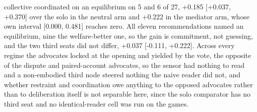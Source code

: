 collective coordinated on an equilibrium on 5 and 6 of 27, +0.185
[+0.037, +0.370] over the solo in the neutral arm and +0.222 in the
mediator arm, whose own interval [0.000, 0.481] reaches zero. All eleven
recommendations named an equilibrium, nine the welfare-better one, so
the gain is commitment, not guessing, and the two third seats did not
differ, +0.037 [-0.111, +0.222]. Across every regime the advocates locked
at the opening and yielded by the vote, the opposite of the dispute and
paired-account advocates, so the sensor had nothing to read and a
non-embodied third node steered nothing the naive reader did not, and
whether restraint and coordination owe anything to the opposed advocates
rather than to deliberation itself is not separable here, since the solo
comparator has no third seat and no identical-reader cell was run on the
games.
